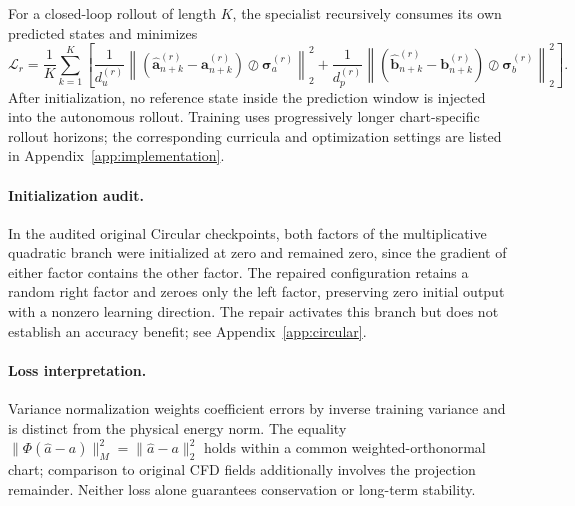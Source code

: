 For a closed-loop rollout of length $K$, the specialist recursively
consumes its own predicted states and minimizes
\begin{equation}
  \mathcal L_r
  =
  \frac{1}{K}
  \sum_{k=1}^{K}
  \left[
    \frac{1}{d_u^{(r)}}
    \left\|
      \left(
        \widehat{\bm a}_{n+k}^{(r)}
        -
        \bm a_{n+k}^{(r)}
      \right)
      \oslash
      \bm\sigma_a^{(r)}
    \right\|_2^2
    +
    \frac{1}{d_p^{(r)}}
    \left\|
      \left(
        \widehat{\bm b}_{n+k}^{(r)}
        -
        \bm b_{n+k}^{(r)}
      \right)
      \oslash
      \bm\sigma_b^{(r)}
    \right\|_2^2
  \right].
  \label{eq:app_true_rollout_loss}
\end{equation}
After initialization, no reference state inside the prediction window is
injected into the autonomous rollout. Training uses progressively longer
chart-specific rollout horizons; the corresponding curricula and
optimization settings are listed in Appendix~\ref{app:implementation}.


\paragraph{Initialization audit.}
In the audited original Circular checkpoints, both factors of the
multiplicative quadratic branch were initialized at zero and remained
zero, since the gradient of either factor contains the other factor.
The repaired configuration retains a random right factor and zeroes only
the left factor, preserving zero initial output with a nonzero learning
direction. The repair activates this branch but does not establish an
accuracy benefit; see Appendix~\ref{app:circular}.

\paragraph{Loss interpretation.}
Variance normalization weights coefficient errors by inverse training
variance and is distinct from the physical energy norm. The equality
$\|\Phi(\widehat a-a)\|_M^2=\|\widehat a-a\|_2^2$ holds within a common
weighted-orthonormal chart; comparison to original CFD fields additionally
involves the projection remainder. Neither loss alone guarantees
conservation or long-term stability.
